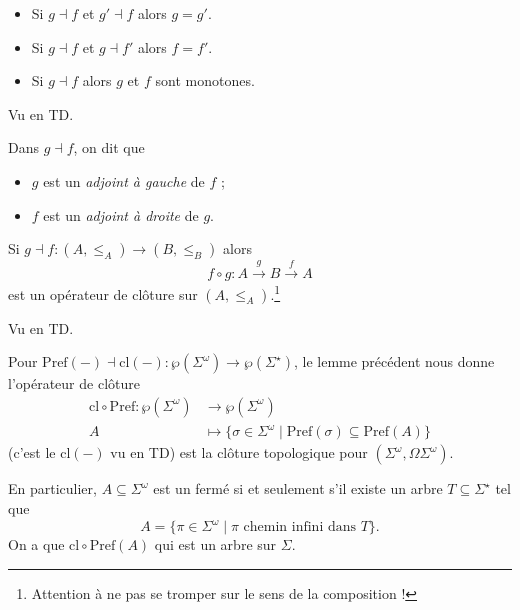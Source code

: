 \documentclass[./main]{subfiles}
\begin{document}
  \begin{lem}
    \begin{itemize}
      \item Si $g \dashv f$ et $g' \dashv f$ alors $g = g'$.
      \item Si $g \dashv f$ et $g \dashv f'$ alors $f = f'$.
      \item Si $g \dashv f$ alors $g$ et $f$ sont monotones.
    \end{itemize}
  \end{lem}
  \begin{prv}
    Vu en TD.
  \end{prv}

  Dans $g \dashv f$, on dit que 
  \begin{itemize}
    \item $g$ est un \textit{adjoint à gauche} de $f$ ;
    \item $f$ est un \textit{adjoint à droite} de $g$.
  \end{itemize}

  \begin{lem}
    Si $g \dashv f : (A, \le_A) \to (B, \le_B)$ alors 
    \[
    f \circ g : A \overset g \longrightarrow B \overset f \longrightarrow A
    \] 
    est un opérateur de clôture sur $(A, \le_A)$.\footnote{Attention à ne pas se tromper sur le sens de la composition !}
  \end{lem}
  \begin{prv}
    Vu en TD.
  \end{prv}

  \begin{exm}
    Pour $\mathrm{Pref}(-) \dashv \mathrm{cl}(-) : \wp(\Sigma^\omega) \to \wp(\Sigma^\star)$,
    le lemme précédent nous donne l'opérateur de clôture 
    \begin{align*}
      \mathrm{cl} \circ \mathrm{Pref}: \wp(\Sigma^\omega) &\longrightarrow \wp(\Sigma^\omega) \\
      A &\longmapsto \{\sigma \in \Sigma^\omega  \mid \mathrm{Pref}(\sigma) \subseteq \mathrm{Pref}(A)\} 
    \end{align*}
    (c'est le $\mathrm{cl}(-)$ vu en TD)
    est la clôture topologique pour $(\Sigma^\omega, \Omega \Sigma^\omega)$.
  \end{exm}

  \begin{rmk}
    En particulier, $A \subseteq \Sigma^\omega$ est un fermé si et seulement s'il existe un arbre $T \subseteq \Sigma^\star$ tel que \[
    A = \{\pi \in \Sigma^\omega  \mid \pi \text{ chemin infini dans } T\} 
    .\]
    On a que $\mathrm{cl} \circ \mathrm{Pref}(A)$ qui est un arbre sur $\Sigma$.
  \end{rmk}
\end{document}

